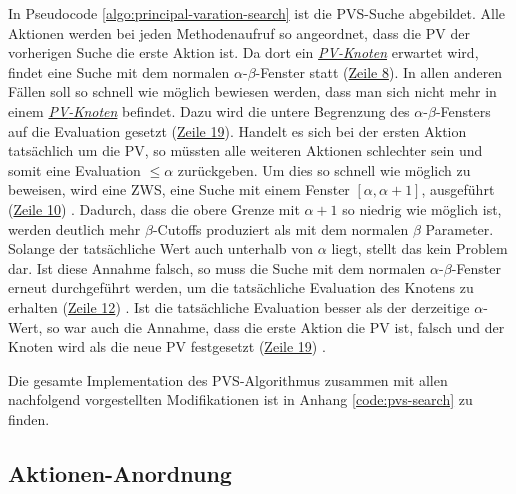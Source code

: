 \endgroup

In Pseudocode \ref{algo:principal-varation-search} ist die \ac{PVS}-Suche abgebildet. Alle Aktionen werden bei jeden Methodenaufruf so angeordnet, dass die \acl{PV} der vorherigen Suche die erste Aktion ist. Da dort ein \hyperref[text:pv-node]{\emph{\acs{PV}-Knoten}} erwartet wird, findet eine Suche mit dem normalen $\alpha$-$\beta$-Fenster statt (\hyperref[alg:pvs-line-8]{Zeile 8}). In allen anderen Fällen soll so schnell wie möglich bewiesen werden, dass man sich nicht mehr in einem \hyperref[text:pv-node]{\emph{\acs{PV}-Knoten}} befindet. Dazu wird die untere Begrenzung des $\alpha$-$\beta$-Fensters auf die Evaluation gesetzt (\hyperref[alg:pvs-line-19]{Zeile 19}). Handelt es sich bei der ersten Aktion tatsächlich um die \acl{PV}, so müssten alle weiteren Aktionen schlechter sein und somit eine Evaluation $\le \alpha$ zurückgeben. Um dies so schnell wie möglich zu beweisen, wird eine \acf{ZWS}, eine Suche mit einem Fenster $\left[\alpha, \alpha + 1\right]$, ausgeführt (\hyperref[alg:pvs-line-10]{Zeile 10}) \cite[S. 317]{2005.EnhancedForwardPruning}. Dadurch, dass die obere Grenze mit $\alpha + 1$ so niedrig wie möglich ist, werden deutlich mehr $\beta$-Cutoffs produziert als mit dem normalen $\beta$ Parameter. Solange der tatsächliche Wert auch unterhalb von $\alpha$ liegt, stellt das kein Problem dar. Ist diese Annahme falsch, so muss die Suche mit dem normalen $\alpha$-$\beta$-Fenster erneut durchgeführt werden, um die tatsächliche Evaluation des Knotens zu erhalten (\hyperref[alg:pvs-line-12]{Zeile 12}) \cite{2002.PrincipalVariationSearch}. Ist die tatsächliche Evaluation besser als der derzeitige $\alpha$-Wert, so war auch die Annahme, dass die erste Aktion die \acl{PV} ist, falsch und der Knoten wird als die neue \acl{PV} festgesetzt (\hyperref[alg:pvs-line-19]{Zeile 19}) \cite[S. 5]{1999.SolutionTreesGameTreeSearch}.

\vspace*{-5cm}

\pagebreak

Die gesamte Implementation des \ac{PVS}-Algorithmus zusammen mit allen nachfolgend vorgestellten Modifikationen ist in Anhang \ref{code:pvs-search} zu finden.

\subsection{Aktionen-Anordnung}


